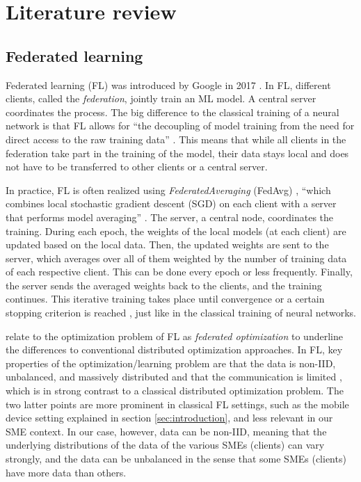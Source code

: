 \section{Literature review\label{sec:literature_review}}

\subsection{Federated learning}
Federated learning (FL) was introduced by Google in 2017 \citep{mcmahan2017communication}. In FL, different clients, called the \emph{federation}, jointly train an ML model. A central server coordinates the process. The big difference to the classical training of a neural network is that FL allows for ``the decoupling of model training from the need for direct access to the raw training data'' \citep{konevcny2016federated}. This means that while all clients in the federation take part in the training of the model, their data stays local and does not have to be transferred to other clients or a central server.

In practice, FL is often realized using \emph{FederatedAveraging} (FedAvg) \citep{mcmahan2017communication, li2020federated}, ``which combines local stochastic gradient descent (SGD) on each client with a server that performs model averaging'' \citep{mcmahan2017communication}. The server, a central node, coordinates the training. During each epoch, the weights of the local models (at each client) are updated based on the local data. Then, the updated weights are sent to the server, which averages over all of them weighted by the number of training data of each respective client. This can be done every epoch or less frequently. Finally, the server sends the averaged weights back to the clients, and the training continues. This iterative training takes place until convergence or a certain stopping criterion is reached \citep{mcmahan2017communication}, just like in the classical training of neural networks.

\citet{mcmahan2017communication} relate to the optimization problem of FL as \emph{federated optimization} to underline the differences to conventional distributed optimization approaches. In FL, key properties of the optimization/learning problem are that the data is non-IID, unbalanced, and massively distributed and that the communication is limited \citep{mcmahan2017communication, konevcny2016federated}, which is in strong contrast to a classical distributed optimization problem. The two latter points are more prominent in classical FL settings, such as the mobile device setting explained in section \ref{sec:introduction}, and less relevant in our SME context. In our case, however, data can be non-IID, meaning that the underlying distributions of the data of the various SMEs (clients) can vary strongly, and the data can be unbalanced in the sense that some SMEs (clients) have more data than others.


